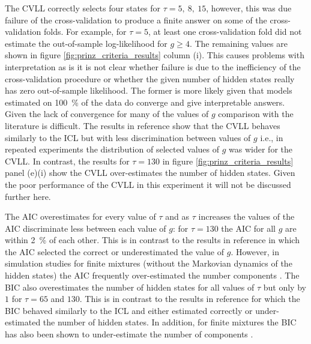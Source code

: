 The CVLL correctly selects four states for $\tau = 5,\ 8,\ 15$, however, this was due failure of the cross-validation to produce a finite answer on some of the cross-validation folds. For example, for $\tau=5$, at least one cross-validation fold did not estimate the out-of-sample log-likelihood for $g\ge 4$. The remaining values are shown in figure \ref{fig:prinz_criteria_results} column (i). This causes problems with interpretation as is it is not clear whether failure is due to the  inefficiency of the cross-validation procedure or whether the given number of hidden states really has zero out-of-sample likelihood. The former is more likely given that models estimated on \SI{100}{\percent} of the data do converge and give interpretable answers. Given the lack of convergence for many of the values of $g$ comparison with the literature is difficult. The results in reference \cite{celeuxSelectingHiddenMarkov2008} show that the CVLL behaves similarly to the ICL but with less discrimination between values of $g$ i.e., in repeated experiments the distribution of selected values of $g$ was wider for the CVLL. In contrast, the results for $\tau=130$ in figure \ref{fig:prinz_criteria_results} panel (e)(i) show the CVLL over-estimates the number of hidden states.  Given the poor performance of the CVLL in this experiment it will not be discussed further here. 

The AIC overestimates for every value of $\tau$ and as $\tau$ increases the values of the AIC discriminate less between each value of $g$: for $\tau = 130$ the AIC for all $g$ are within \SI{2}{\percent} of each other. This is in contrast to the results in reference \cite{celeuxSelectingHiddenMarkov2008} in which the AIC selected the correct or underestimated the value of $g$. However, in simulation studies for finite mixtures (without the Markovian dynamics of the hidden states) the AIC frequently over-estimated the number components \cite{celeuxEntropyCriterionAssessing1996, soromenho1994comparing}. The BIC also overestimates the number of hidden states for all values of $\tau$ but only by $1$ for $\tau=65$ and $130$. This is in contrast to the results in reference  \cite{celeuxSelectingHiddenMarkov2008} for which the BIC behaved similarly to the ICL and either estimated correctly or under-estimated the number of hidden states.  In addition, for finite mixtures the BIC has also been shown to under-estimate the number of components \cite{biernackiAssessingMixtureModel2000a}.

